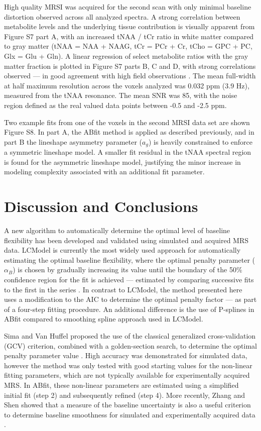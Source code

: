 \documentclass[num-refs]{wiley-article}
\begin{document}
High quality MRSI was acquired for the second scan with only minimal baseline distortion observed across all analyzed spectra. A strong correlation between metabolite levels and the underlying tissue contribution is visually apparent from Figure S7 part A, with an increased tNAA / tCr ratio in white matter compared to gray matter (tNAA = NAA + NAAG, tCr = PCr + Cr, tCho = GPC + PC, Glx = Glu + Gln). A linear regression of select metabolite ratios with the gray matter fraction is plotted in Figure S7 parts B, C and D, with strong correlations observed --- in good agreement with high field observations \cite{Nassirpour2018, Hangel2018}. The mean full-width at half maximum resolution across the voxels analyzed was 0.032 ppm (3.9 Hz), measured from the tNAA resonance. The mean SNR was 85, with the noise region defined as the real valued data points between -0.5 and -2.5 ppm.

Two example fits from one of the voxels in the second MRSI data set are shown Figure S8. In part A, the ABfit method is applied as described previously, and in part B the lineshape asymmetry parameter ($a_{g}$) is heavily constrained to enforce a symmetric lineshape model. A smaller fit residual in the tNAA spectral region is found for the asymmetric lineshape model, justifying the minor increase in modeling complexity associated with an additional fit parameter.

\section{Discussion and Conclusions}
A new algorithm to automatically determine the optimal level of baseline flexibility has been developed and validated using simulated and acquired MRS data. LCModel is currently the most widely used approach for automatically estimating the optimal baseline flexibility, where the optimal penalty parameter ($\alpha_{B}$) is chosen by gradually increasing its value until the boundary of the 50\% confidence region for the fit is achieved --- estimated by comparing successive fits to the first in the series \cite{Provencher1982, Provencher1993}. In contrast to LCModel, the method presented here uses a modification to the AIC to determine the optimal penalty factor --- as part of a four-step fitting procedure. An additional difference is the use of P-splines in ABfit compared to smoothing spline approach \cite{OSullivan1986} used in LCModel.

Sima and Van Huffel proposed the use of the classical generalized cross-validation (GCV) criterion, combined with a golden-section search, to determine the optimal penalty parameter value \cite{Sima2006}. High accuracy was demonstrated for simulated data, however the method was only tested with good starting values for the non-linear fitting parameters, which are not typically available for experimentally acquired MRS. In ABfit, these non-linear parameters are estimated using a simplified initial fit (step 2) and subsequently refined (step 4). More recently, Zhang and Shen showed that a measure of the baseline uncertainty is also a useful criterion to determine baseline smoothness for simulated and experimentally acquired data \cite{Zhang2014}.
\end{document}
